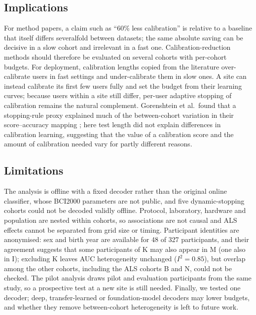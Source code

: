 \documentclass[conference]{IEEEtran}
\begin{document}
\subsection{Implications}
For method papers, a claim such as ``60\% less calibration'' is relative to a baseline that itself differs severalfold between datasets; the same absolute saving can be decisive in a slow cohort and irrelevant in a fast one. Calibration-reduction methods should therefore be evaluated on several cohorts with per-cohort budgets. For deployment, calibration lengths copied from the literature over-calibrate users in fast settings and under-calibrate them in slow ones. A site can instead calibrate its first few users fully and set the budget from their learning curves; because users within a site still differ, per-user adaptive stopping of calibration remains the natural complement. Gorenshtein et al.\ found that a stopping-rule proxy explained much of the between-cohort variation in their score--accuracy mapping \cite{gorenshtein2026}; here test length did not explain differences in calibration learning, suggesting that the value of a calibration score and the amount of calibration needed vary for partly different reasons.

\subsection{Limitations}
The analysis is offline with a fixed decoder rather than the original online classifier, whose BCI2000 parameters are not public, and five dynamic-stopping cohorts could not be decoded validly offline. Protocol, laboratory, hardware and population are nested within cohorts, so associations are not causal and ALS effects cannot be separated from grid size or timing. Participant identities are anonymised: sex and birth year are available for 48 of 327 participants, and their agreement suggests that some participants of K may also appear in M (one also in I); excluding K leaves AUC heterogeneity unchanged ($I^2=0.85$), but overlap among the other cohorts, including the ALS cohorts B and N, could not be checked. The pilot analysis draws pilot and evaluation participants from the same study, so a prospective test at a new site is still needed. Finally, we tested one decoder; deep, transfer-learned or foundation-model decoders \cite{wu2022,jiang2024} may lower budgets, and whether they remove between-cohort heterogeneity is left to future work.

\end{document}
